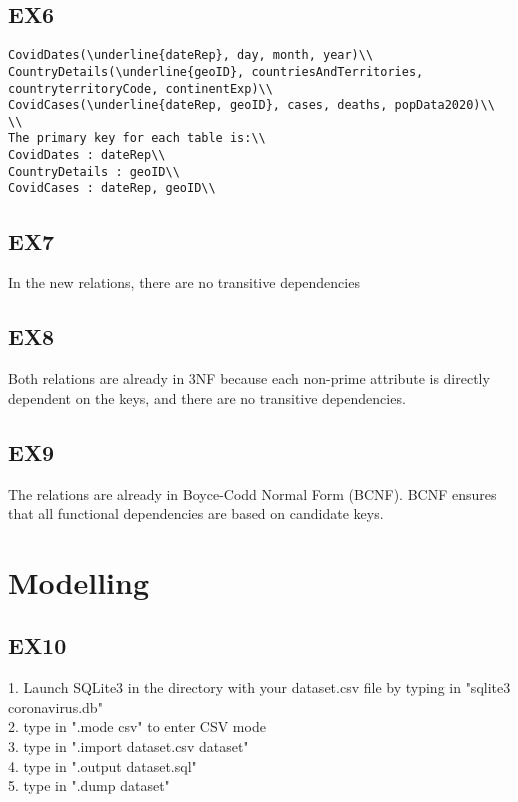 \documentclass{article}
\begin{document}
\subsection{EX6}
\begin{verbatim}
CovidDates(\underline{dateRep}, day, month, year)\\
CountryDetails(\underline{geoID}, countriesAndTerritories, 
countryterritoryCode, continentExp)\\
CovidCases(\underline{dateRep, geoID}, cases, deaths, popData2020)\\
\\
The primary key for each table is:\\
CovidDates : dateRep\\
CountryDetails : geoID\\
CovidCases : dateRep, geoID\\
\end{verbatim}

\subsection{EX7}
In the new relations, there are no transitive dependencies

\subsection{EX8}
Both relations are already in 3NF because each non-prime attribute is directly dependent on the keys, and there are no transitive dependencies.

\subsection{EX9}
The relations are already in Boyce-Codd Normal Form (BCNF). BCNF ensures that all functional dependencies are based on candidate keys.

\section{Modelling}
\subsection{EX10}
1. Launch SQLite3 in the directory with your dataset.csv file by typing in "sqlite3 coronavirus.db"\\
2. type in ".mode csv" to enter CSV mode\\
3. type in ".import dataset.csv dataset"\\
4. type in ".output dataset.sql"\\
5. type in ".dump dataset"\\
\end{document}
